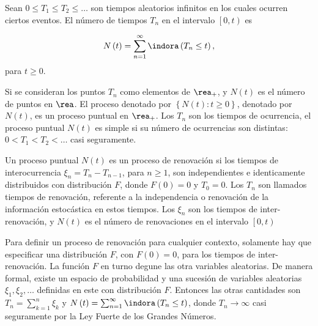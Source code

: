 %
%
\begin{Def}%
Sean $0\leq T_{1}\leq T_{2}\leq \ldots$ son tiempos aleatorios infinitos en los cuales ocurren ciertos eventos. El n\'umero de tiempos $T_{n}$ en el intervalo $\left[0,t\right)$ es

\begin{eqnarray}
N\left(t\right)=\sum_{n=1}^{\infty}\indora\left(T_{n}\leq t\right),
\end{eqnarray}
para $t\geq0$.
\end{Def}

Si se consideran los puntos $T_{n}$ como elementos de $\rea_{+}$, y $N\left(t\right)$ es el n\'umero de puntos en $\rea$. El proceso denotado por $\left\{N\left(t\right):t\geq0\right\}$, denotado por $N\left(t\right)$, es un proceso puntual en $\rea_{+}$. Los $T_{n}$ son los tiempos de ocurrencia, el proceso puntual $N\left(t\right)$ es simple si su n\'umero de ocurrencias son distintas: $0<T_{1}<T_{2}<\ldots$ casi seguramente.

\begin{Def}
Un proceso puntual $N\left(t\right)$ es un proceso de renovaci\'on si los tiempos de interocurrencia $\xi_{n}=T_{n}-T_{n-1}$, para $n\geq1$, son independientes e identicamente distribuidos con distribuci\'on $F$, donde $F\left(0\right)=0$ y $T_{0}=0$. Los $T_{n}$ son llamados tiempos de renovaci\'on, referente a la independencia o renovaci\'on de la informaci\'on estoc\'astica en estos tiempos. Los $\xi_{n}$ son los tiempos de inter-renovaci\'on, y $N\left(t\right)$ es el n\'umero de renovaciones en el intervalo $\left[0,t\right)$
\end{Def}


\begin{Note}
Para definir un proceso de renovaci\'on para cualquier contexto, solamente hay que especificar una distribuci\'on $F$, con $F\left(0\right)=0$, para los tiempos de inter-renovaci\'on. La funci\'on $F$ en turno degune las otra variables aleatorias. De manera formal, existe un espacio de probabilidad y una sucesi\'on de variables aleatorias $\xi_{1},\xi_{2},\ldots$ definidas en este con distribuci\'on $F$. Entonces las otras cantidades son $T_{n}=\sum_{k=1}^{n}\xi_{k}$ y $N\left(t\right)=\sum_{n=1}^{\infty}\indora\left(T_{n}\leq t\right)$, donde $T_{n}\rightarrow\infty$ casi seguramente por la Ley Fuerte de los Grandes N\'umeros.
\end{Note}







